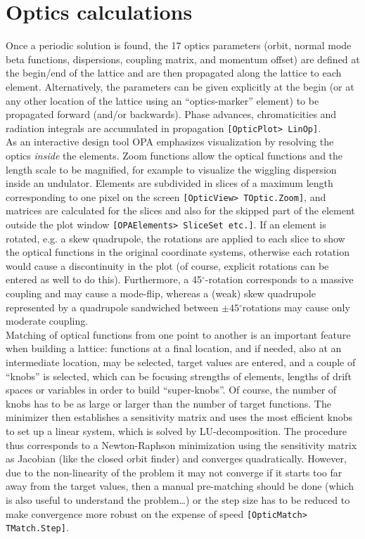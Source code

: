 \documentclass[12pt]{article}
\newcommand{\degree}{\mbox{$^{\circ}$}}
\newcommand\code[1]{{\tt [#1]}}
\begin{document}
\section{Optics calculations}

Once a periodic solution is found, the 17 optics parameters (orbit, normal mode beta functions, dispersions, coupling matrix, and momentum offset) are defined at the begin/end of the lattice and are then propagated along the lattice to each element. Alternatively, the parameters can be given explicitly at the begin (or at any other location of the lattice using an ``optics-marker'' element) to be propagated forward (and/or backwards). Phase advances, chromaticities and radiation integrals are accumulated in propagation \code{OpticPlot> LinOp}.\\

As an interactive design tool OPA emphasizes visualization by resolving the optics {\em inside} the elements. Zoom functions allow the optical functions and the length scale to be magnified, for example to visualize the wiggling dispersion inside an undulator. Elements are subdivided in slices of a maximum length corresponding to one pixel on the screen \code{OpticView> TOptic.Zoom}, and matrices are calculated for the slices and also for the skipped part of the element outside the plot window \code{OPAElements> SliceSet \mbox{\rm etc.}}. If an element is rotated, e.g. a skew quadrupole, the rotations are applied to each slice to show the optical functions in the original coordinate systems, otherwise each rotation would cause a discontinuity in the plot (of course, explicit rotations can be entered as well to do this). Furthermore, a 45\degree-rotation corresponds to a massive coupling and may cause a mode-flip, whereas a (weak) skew quadrupole represented by a quadrupole sandwiched between $\pm 45$\degree\-rotations may cause only moderate coupling.\\

Matching of optical functions from one point to another is an important feature when building a lattice: functions at a final location, and if needed, also at an intermediate location, may be selected, target values are entered, and a couple of ``knobs'' is selected, which can be focusing strengths of elements, lengths of drift spaces or variables in order to build ``super-knobs''. Of course, the number of knobs has to be as large or larger than the number of target functions. The minimizer then establishes a sensitivity matrix and uses the most efficient knobs to set up a linear system, which is solved by LU-decomposition. The procedure thus corresponds to a Newton-Raphson minimization using the sensitivity matrix as Jacobian (like the closed orbit finder) and converges quadratically. However, due to the non-linearity of the problem it may not converge if it starts too far away from the target values, then a manual pre-matching should be done (which is also useful to understand the problem\dots ) or the step size has to be reduced to make convergence more robust on the expense of speed \code{OpticMatch> TMatch.Step}.
\end{document}
